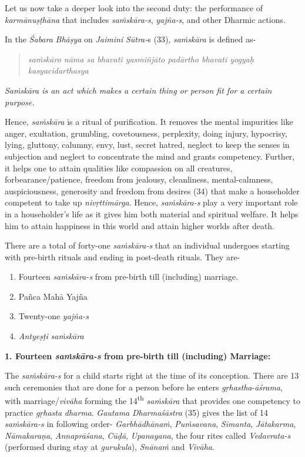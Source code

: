 Let us now take a deeper look into the second duty: the performance of \emph{karmānuṣṭhāna} that includes \emph{saṁskāra-s}, \emph{yajña-s}, and other Dharmic actions.

In the \emph{Śabara} \emph{Bhāṣya} on \emph{Jaimini} \emph{Sūtra-}s (33), \emph{saṁskāra} is defined as-

\begin{verse}
\emph{saṁskāro nāma sa bhavati yasmiñjāto padārtho bhavati yogyaḥ kasyacidarthasya }
\end{verse}

\emph{Saṁskāra is an act which makes a certain thing or person fit for a certain purpose.}

Hence, \emph{saṁskāra} is a ritual of purification. It removes the mental impurities like anger, exultation, grumbling, covetousness, perplexity, doing injury, hypocrisy, lying, gluttony, calumny, envy, lust, secret hatred, neglect to keep the senses in subjection and neglect to concentrate the mind and grants competency. Further, it helps one to attain qualities like compassion on all creatures, forbearance/patience, freedom from jealousy, cleanliness, mental-calmness, auspiciousness, generosity and freedom from desires (34) that make a householder competent to take up \emph{nivṛttimārga}. Hence, \emph{saṁskāra-s} play a very important role in a householder's life as it gives him both material and spiritual welfare. It helps him to attain happiness in this world and attain higher worlds after death.

There are a total of forty-one \emph{saṁskāra-s} that an individual undergoes starting with pre-birth rituals and ending in post-death rituals. They are-

\begin{enumerate}
\itemsep=0pt
\item
  Fourteen \emph{saṁskāra-s} from pre-birth till (including) marriage.
\item
  Pañca Mahā Yajña
\item
  Twenty-one \emph{yajña-s}
\item
  \emph{Antyeṣṭi} \emph{saṁskāra}
\end{enumerate}

\textbf{1. Fourteen \emph{saṁskāra-s} from pre-birth till (including) Marriage:}

The \emph{saṁskāra-s} for a child starts right at the time of its conception. There are 13 such ceremonies that are done for a person before he enters \emph{gṛhastha}-\emph{āśrama}, with marriage/\emph{vivāha} forming the 14\textsuperscript{th} \emph{saṁskāra} that provides one competency to practice \emph{gṛhasta} \emph{dharma}. \emph{Gautama} \emph{Dharmaśāstra} (35) gives the list of 14 \emph{saṁskāra-s} in following order- \emph{Garbhādhānaṁ}, \emph{Puṁsavana}, \emph{Sīmanta}, \emph{Jātakarma}, \emph{Nāmakaraṇa}, \emph{Annaprāśana}, \emph{Cūḍā}, \emph{Upanayana}, the four rites called \emph{Vedavrata-s} (performed during stay at \emph{gurukula}), \emph{Snānaṁ} and \emph{Vivāha}.

